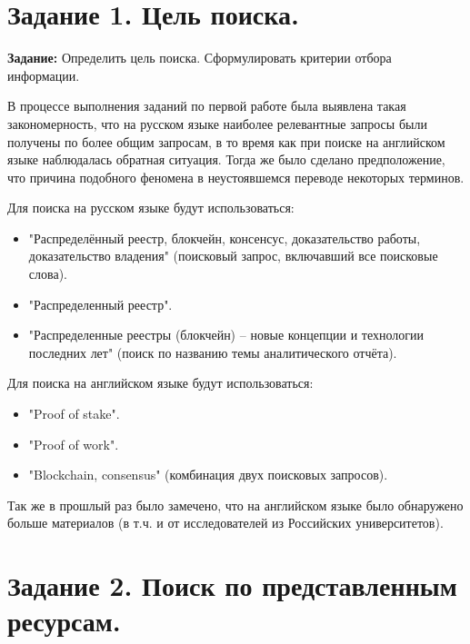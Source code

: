 \documentclass[a4paper, 12pt]{report}		%
\begin{document}
\tableofcontents

\chapter*{Задание 1. Цель поиска.}

\textbf{Задание:} Определить цель поиска. Сформулировать критерии отбора информации.

\vspace{1cm}

В процессе выполнения заданий по первой работе была выявлена такая закономерность, что на русском языке наиболее релевантные запросы были получены по более общим запросам, в то время как при поиске на английском языке наблюдалась обратная ситуация. Тогда же было сделано предположение, что причина подобного феномена в неустоявшемся переводе некоторых терминов.

Для поиска на русском языке будут использоваться:
\begin{itemize}
\item "Распределённый реестр, блокчейн, консенсус, доказательство работы, доказательство владения" (поисковый запрос, включавший все поисковые слова).
\item "Распределенный реестр".
\item "Распределенные реестры (блокчейн) -- новые концепции и технологии последних лет" (поиск по названию темы аналитического отчёта).
\end{itemize}

Для поиска на английском языке будут использоваться:
\begin{itemize}
\item "Proof of stake".
\item "Proof of work".
\item "Blockchain, consensus" (комбинация двух поисковых запросов).
\end{itemize}

Так же в прошлый раз было замечено, что на английском языке было обнаружено больше материалов (в т.ч. и от исследователей из Российских университетов).

\chapter*{Задание 2. Поиск по представленным ресурсам.}
\end{document}
